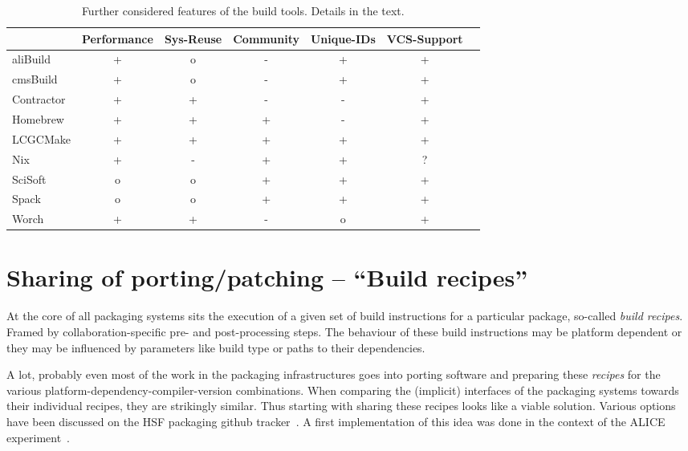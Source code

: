 \documentclass[12pt,a4paper]{article}
\begin{document}
\begin{table}
\centering
\begin{tabular}{lcccccc}

&Performance & Sys-Reuse & Community & Unique-IDs & VCS-Support\\ \hline
aliBuild & \cellcolor{green} + & \cellcolor{yellow} o & \cellcolor{red} - & \cellcolor{green} +& \cellcolor{green} +  \\
cmsBuild & \cellcolor{green} + & \cellcolor{yellow} o & \cellcolor{red} - & \cellcolor{green} +& \cellcolor{green} +  \\
Contractor & \cellcolor{green} + & \cellcolor{green} + & \cellcolor{red} - & \cellcolor{red} - & \cellcolor{green} + \\
Homebrew & \cellcolor{green} +  & \cellcolor{green} +  & \cellcolor{green} + & \cellcolor{red} - & \cellcolor{green} + \\
LCGCMake & \cellcolor{green} + & \cellcolor{green} + & \cellcolor{yellow} + & \cellcolor{green} + & \cellcolor{green} + \\
Nix & \cellcolor{green} + & \cellcolor{red} -  & \cellcolor{green} + & \cellcolor{green} + & ? \\
SciSoft & \cellcolor{yellow} o & \cellcolor{yellow} o & \cellcolor{green} + &  \cellcolor{green} + & \cellcolor{green}+  \\
Spack & \cellcolor{yellow} o & \cellcolor{yellow} o  & \cellcolor{green} + & \cellcolor{green} +& \cellcolor{green} +\\
Worch & \cellcolor{green} + &  \cellcolor{green} + & \cellcolor{red} -  & \cellcolor{yellow} o & \cellcolor{green} +
\end{tabular}
\caption{\label{tab:taxonomyOthers}Further considered features of the build tools. Details in the text.}
\end{table}

\section{Sharing of porting/patching -- ``Build recipes''}
At the core of all packaging systems sits the execution of a given set of build instructions for a particular package, so-called \emph{build recipes}. Framed by collaboration-specific pre- and post-processing steps. The behaviour of these build instructions may be platform dependent or they may be influenced by parameters like build type or paths to their dependencies.

A lot, probably even most of the work in the packaging infrastructures goes into porting software and preparing these \emph{recipes} for the various platform-dependency-compiler-version combinations. When comparing the (implicit) interfaces of the packaging systems towards their individual recipes, they are strikingly similar. Thus starting with sharing these recipes looks like a viable solution. Various options have been discussed on the HSF packaging github tracker~\cite{github:discussion}. A first implementation of this idea was done in the context of the ALICE experiment~\cite{alidist}.
\end{document}
